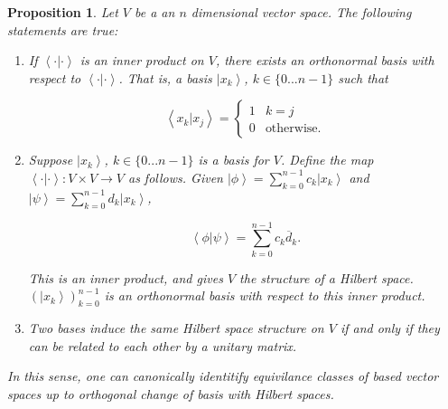 \documentclass{article}
\newtheorem{proposition}{Proposition}[section]
\theoremstyle{definition}
\numberwithin{figure}{section}
\begin{document}
\begin{proposition}\label{Hilbert properties} Let $V$ be a an $n$ dimensional vector space. The following statements are true:

\begin{enumerate}
\item If $\left<\cdot|\cdot\right>$ is an inner product on $V$, there exists an orthonormal basis with respect to $\left<\cdot|\cdot\right>$. That is, a basis $\left|x_k\right>$, $k\in \{0...n-1\}$ such that

$$\left<x_k|x_j\right>=
\begin{cases}
1 & k=j\\
0 & \text{otherwise}.
\end{cases}$$

\item Suppose $\left|x_k\right>$, $k\in \{0...n-1\}$  is a basis for $V$. Define the map $\left<\cdot|\cdot\right>:V\times V\to V$ as follows. Given $\left|\phi\right>=\sum_{k=0}^{n-1}c_k \left|x_k\right>$ and $\left|\psi\right>=\sum_{k=0}^{n-1}d_k\left|x_k\right>$,

$$\left<\phi|\psi\right>=\sum_{k=0}^{n-1}c_k\overline{d}_k.$$

This is an inner product, and gives $V$ the structure of a Hilbert space. $(\left|x_k\right>)_{k=0}^{n-1}$ is an orthonormal basis with respect to this inner product.

\item Two bases induce the same Hilbert space structure on $V$ if and only if they can be related to each other by a unitary matrix.
\end{enumerate}

In this sense, one can canonically identitify equivilance classes of based vector spaces up to orthogonal change of basis with Hilbert spaces.
\end{proposition}
\end{document}
